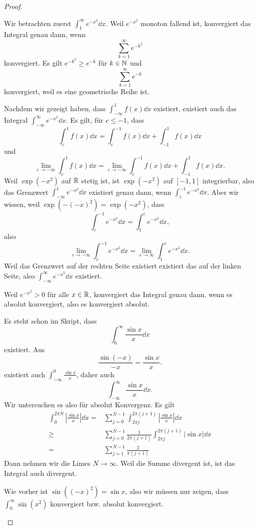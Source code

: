 \begin{proof}
	\begin{parts}
	\item Wir betrachten zuerst $\int_1^\infty e^{-x^2}\dd{x}$. Weil $e^{-x^2}$ monoton fallend ist, konvergiert das Integral genau dann, wenn
		\[
			\sum_{k=1}^\infty e^{-k^2}
		\]
		konvergiert. Es gilt $e^{-k^2}\ge e^{-k}$ f\"{u}r $k\in \mathbb{N}$ und
		\[
			\sum_{k=1}^\infty e^{-k}
		\]
		konvergiert, weil es eine geometrische Reihe ist. 

		Nachdem wir gezeigt haben, dass $\int_{-\infty}^{1}f(x)\dd{x}$ existiert, existiert auch das Integral $\int_{-\infty}^\infty e^{-x^2}\dd{x}$. Es gilt, f\"{u}r $c\le -1$, dass
		\[
			\int_{c}^1 f(x)\dd{x}=\int_{c}^{-1} f(x)\dd{x}+\int_{-1}^1 f(x)\dd{x}
		\]
		und
		\[
			\lim_{c \to -\infty} \int_c^1 f(x)\dd{x}=\lim_{c \to -\infty} \int_{c}^{-1}f(x)\dd{x}+\int_{-1}^1f(x)\dd{x}
		.\] 
		Weil $\exp(-x^2)$ auf $\mathbb{R}$ stetig ist, ist $\exp(-x^2)$ auf $[-1,1]$ integrierbar, also das Grenzwert $\int_{-\infty}^1 e^{-x^2}\dd{x}$ existiert genau dann, wenn $\int_c^{-1}e^{-x^2}\dd{x}$. Aber wir wissen, weil $\exp(-(-x)^2)=\exp(-x^2)$, dass
		\[
			\int_{c}^{-1}e^{-x^2}\dd{x}=\int_1^c e^{-x^2}\dd{x}
		,\] 
		also
		\[
			\lim_{c \to -\infty} \int_{c}^{-1}e^{-x^2}\dd{x}=\lim_{c \to \infty} \int_1^c e^{-x^2}\dd{x}
		.\] 
		Weil das Grenzwert auf der rechten Seite existiert existiert das auf der linken Seite, also $\int_{-\infty}^\infty e^{-x^2}\dd{x}$ existiert.

		Weil $e^{-x^2}>0$ f\"{u}r alle $x\in \mathbb{R}$, konvergiert das Integral genau dann, wenn es absolut konvergiert, also es konvergiert absolut.
	\item Es steht schon im Skript, dass
		\[
			\int_0^\infty \frac{\sin x}{x}\dd{x}
		\]
		existiert. Aus
		\[
			\frac{\sin(-x)}{-x}=\frac{\sin x}{x}
		.\] 
		existiert auch $\int_{-\infty}^0 \frac{\sin x}{x}$, daher auch
		\[
			\int_{-\infty}^\infty \frac{\sin x}{x}\dd{x}
		.\] 
		Wir untersuchen es also f\"{u}r absolut Konvergenz. Es gilt
		\begin{align*}
			\int_0^{2\pi N}\left|\frac{\sin x}{x}\right|\dd{x}=&\sum_{j=0}^{N-1}\int_{2\pi j}^{2\pi(j+1)}\left|\frac{\sin x}{x}\right|\dd{x}\\
			\ge&\sum_{j=0}^{N-1}\frac{1}{2\pi (j+1)}\int_{2\pi j}^{2\pi(j+1)}|\sin x|\dd{x}\\
			=&\sum_{j=1}^{N-1}\frac{2}{\pi(j+1)}
		\end{align*}
		Dann nehmen wir die Limes $N\to \infty$. Weil die Summe divergent ist, ist das Integral auch divergent.
	\item Wie vorher ist $\sin((-x)^2)=\sin x$, also wir müssen nur zeigen, dass $\int_0^\infty \sin(x^2)$ konvergiert bzw. absolut konvergiert.


\end{parts}
\end{proof}
